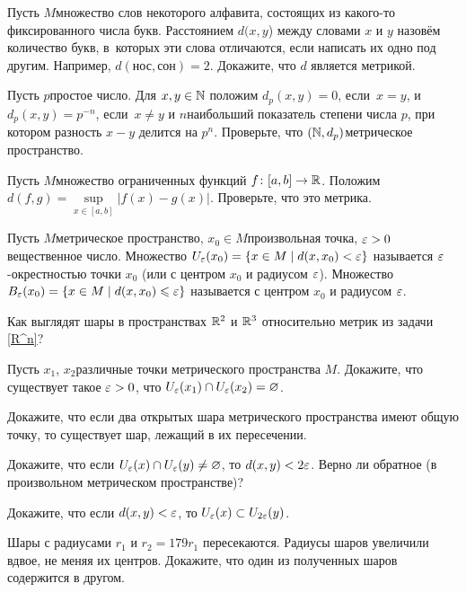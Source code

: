 \documentclass[a4paper,12pt]{article}
\begin{document}
Пусть $M$\т множество слов некоторого алфавита, состоящих из какого-то фиксированного числа букв. Расстоянием $d (x,y$) между словами $x$ и $y$ назовём количество букв, в~которых эти слова отличаются, если написать их одно под другим. Например, $d(\text{нос},\text{сон}) = 2$. Докажите, что $d$ является метрикой.

Пусть $p$\т простое число. Для $x, y \in \mathbb{N}$ положим $d_p(x,y) = 0$, если~$x = y$, и $d_p(x,y) = p^{-n}$, если~$x \ne y$ и $n$\т наибольший показатель степени числа $p$, при котором разность $x-y$ делится на $p^n$. Проверьте, что $(\mathbb{N}, d_p)$\т метрическое пространство.

\label{C}
Пусть $M$\т множество ограниченных функций $f\colon [a,b] \rightarrow \mathbb{R}$. Положим $d (f,g) = \sup\limits_{x\in [a,b]}|f(x) - g(x)|$. Проверьте, что это метрика.

\newpage

Пусть $M$\т метрическое пространство, $x_0\in M$\т произвольная точка, $\varepsilon > 0$\т вещественное число. Множество $U_\varepsilon(x_0) = \{ x\in M \mid d(x, x_0) < \varepsilon\}$ называется $\varepsilon$-окрестностью точки $x_0$ (или  с центром $x_0$ и радиусом $\varepsilon$).
Множество $B_\varepsilon(x_0) = \{ x\in M \mid d(x,x_0)\leqslant\varepsilon\}$ называется  с центром $x_0$ и радиусом $\varepsilon$.

Как выглядят шары в пространствах $\mathbb{R}^2$ и $\mathbb{R}^3$ относительно метрик из
задачи \ref{R^n}?

Пусть $x_1$, $x_2$\т различные точки метрического пространства $M$. Докажите, что существует такое $\varepsilon > 0$, что $U_\varepsilon(x_1) \cap U_\varepsilon(x_2) = \varnothing$.

Докажите, что если два открытых шара метрического пространства имеют общую точку, то существует шар, лежащий в их пересечении.

Докажите, что если $U_{\varepsilon}(x) \cap U_{\varepsilon}(y) \ne \varnothing$, то $d (x,y) < 2\varepsilon$. Верно ли обратное (в произвольном метрическом пространстве)?

Докажите, что если $d(x,y) < \varepsilon$, то $U_\varepsilon(x) \subset U_{2\varepsilon}(y)$.

Шары с радиусами $r_1$ и $r_2 = 179 r_1$ пересекаются. Радиусы шаров увеличили вдвое, не меняя их центров. Докажите, что один из полученных шаров содержится в другом.
\end{document}
